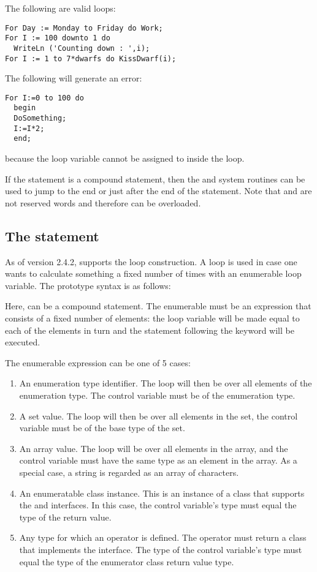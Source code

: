 The following are valid loops:
\begin{verbatim}
For Day := Monday to Friday do Work;
For I := 100 downto 1 do
  WriteLn ('Counting down : ',i);
For I := 1 to 7*dwarfs do KissDwarf(i);
\end{verbatim}
The following will generate an error:
\begin{verbatim}
For I:=0 to 100 do
  begin
  DoSomething;
  I:=I*2;
  end;
\end{verbatim}
because the loop variable  cannot be assigned to inside the loop.

If the statement is a compound statement, then the  and
 system routines can be used to jump to the end or just
after the end of the  statement. Note that  and
 are not reserved words and therefore can be overloaded.

\subsection{The  statement}
As of version 2.4.2, \fpc supports the  loop construction. A
 loop is used in case one wants to calculate something a fixed number of times
with an enumerable loop variable. The prototype syntax is as follows:

Here,  can be a compound statement. The enumerable must be an
expression that consists of a fixed number of elements: the loop variable
will be made equal to each of the elements in turn and the statement following the
 keyword will be executed.

The enumerable expression can be one of 5 cases:
\begin{enumerate}
\item An enumeration type identifier. The loop will then be over all
elements of the enumeration type. The control variable must be of the
enumeration type.
\item A set value. The loop will then be over all elements in the set, the
control variable must be of the base type of the set.
\item An array value. The loop will be over all elements in the array, and
the control variable must have the same type as an element in the array.
As a special case, a string is regarded as an array of characters.
\item An enumeratable class instance. This is an instance of a class that
supports the  and  interfaces. 
In this case, the control variable's type must equal the type of the 
 return value.
\item Any type for which an  operator is defined. The
 operator must return a class that implements the
 interface. The type of the control variable's type 
must equal the type of the enumerator class  return 
value type.
\end{enumerate}

